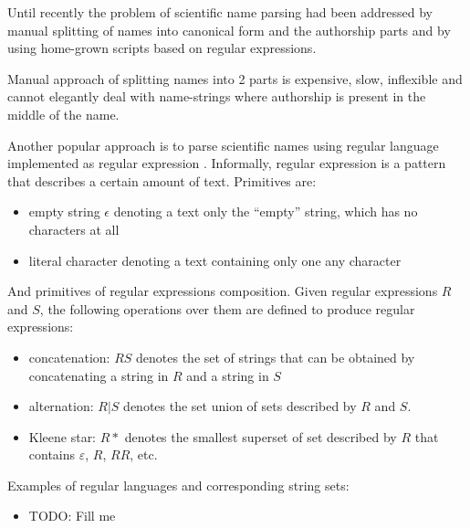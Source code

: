 \documentclass{bmcart}
\begin{document}
Until recently the problem of scientific name parsing had been addressed by
manual splitting of names into canonical form and the authorship parts and
by using home-grown scripts based on regular expressions.

Manual approach of splitting names into 2 parts is expensive, slow, inflexible
and cannot elegantly deal with name-strings where authorship is present in the
middle of the name.

Another popular approach is to parse scientific names using regular language
implemented as regular expression \cite{aho1992foundations}. Informally, regular
expression is a pattern that describes a certain amount of text. Primitives are:

\begin{itemize}
  \item empty string $\epsilon$ denoting a text only the
  ``empty'' string, which has no characters at all
  \item literal character denoting a text containing only one any character
\end{itemize}

And primitives of regular expressions composition. Given regular expressions
$R$ and $S$, the following operations over them are defined to produce regular
expressions:

\begin{itemize}
  \item concatenation: $RS$ denotes the set of strings that can be obtained
  by concatenating a string in $R$ and a string in $S$
  \item alternation: $R \vert S$ denotes the set union of sets described by
  $R$ and $S$.
  \item Kleene star: $R*$ denotes the smallest superset of set described by
  $R$ that contains $\varepsilon$, $R$, $RR$, etc.
\end{itemize}

Examples of regular languages and corresponding string sets:

\begin{itemize}
    \item TODO: Fill me
\end{itemize}
\end{document}
